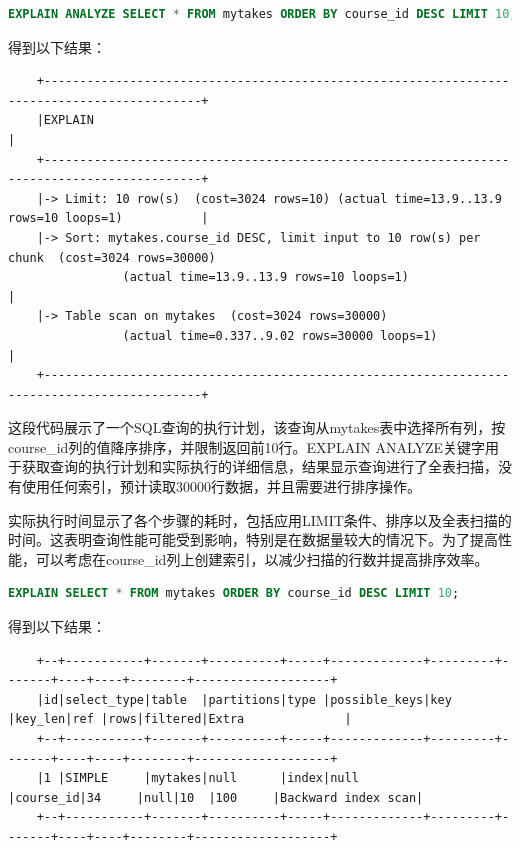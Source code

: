 \documentclass{article}
\begin{document}
	\begin{lstlisting}[language=sql, title=索引对查询性能的影响, tabsize=4]
	EXPLAIN ANALYZE SELECT * FROM mytakes ORDER BY course_id DESC LIMIT 10;
	\end{lstlisting}
	
	得到以下结果：
	
	\begin{verbatim}
	+--------------------------------------------------------------------------------------------+
	|EXPLAIN                                                                                     |
	+--------------------------------------------------------------------------------------------+
	|-> Limit: 10 row(s)  (cost=3024 rows=10) (actual time=13.9..13.9 rows=10 loops=1)           |
	|-> Sort: mytakes.course_id DESC, limit input to 10 row(s) per chunk  (cost=3024 rows=30000) 
	            (actual time=13.9..13.9 rows=10 loops=1)                                         |
	|-> Table scan on mytakes  (cost=3024 rows=30000) 
	            (actual time=0.337..9.02 rows=30000 loops=1)                                     |
	+--------------------------------------------------------------------------------------------+
	\end{verbatim}
	
	这段代码展示了一个SQL查询的执行计划，该查询从mytakes表中选择所有列，按course\_id列的值降序排序，并限制返回前10行。EXPLAIN ANALYZE关键字用于获取查询的执行计划和实际执行的详细信息，结果显示查询进行了全表扫描，没有使用任何索引，预计读取30000行数据，并且需要进行排序操作。
	
	实际执行时间显示了各个步骤的耗时，包括应用LIMIT条件、排序以及全表扫描的时间。这表明查询性能可能受到影响，特别是在数据量较大的情况下。为了提高性能，可以考虑在course\_id列上创建索引，以减少扫描的行数并提高排序效率。
	
	\begin{lstlisting}[language=sql, title=索引对查询性能的影响, tabsize=4]
	EXPLAIN SELECT * FROM mytakes ORDER BY course_id DESC LIMIT 10;
	\end{lstlisting}
	
	得到以下结果：
	
	\begin{verbatim}
	+--+-----------+-------+----------+-----+-------------+---------+-------+----+----+--------+-------------------+
	|id|select_type|table  |partitions|type |possible_keys|key      |key_len|ref |rows|filtered|Extra              |
	+--+-----------+-------+----------+-----+-------------+---------+-------+----+----+--------+-------------------+
	|1 |SIMPLE     |mytakes|null      |index|null         |course_id|34     |null|10  |100     |Backward index scan|
	+--+-----------+-------+----------+-----+-------------+---------+-------+----+----+--------+-------------------+
	\end{verbatim}
	
\end{document}
